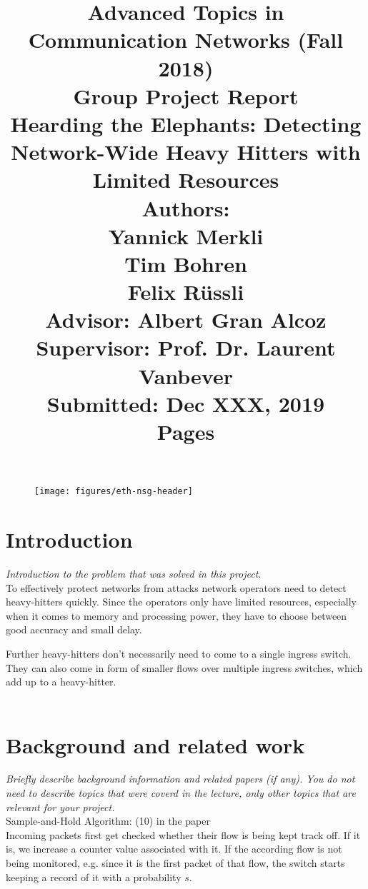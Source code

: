 \documentclass[11pt,oneside,a4paper]{article}
\title{
    \vspace*{0.0mm}
    \LARGE\bf\sf Advanced Topics in \\Communication Networks (Fall 2018)
    \vspace*{10.0mm} \\
    \Large\bf\sf Group Project Report \vspace*{30.0mm}\\
    \Huge\bf\sf Hearding the Elephants: Detecting Network-Wide Heavy Hitters with Limited Resources
    \vspace*{30.0mm} \\
    \normalsize
    \sf Authors:\\[5pt]
    \sf Yannick Merkli\\ [5pt]
    \sf Tim Bohren\\ [5pt]
    \sf Felix Rüssli \vspace*{5mm}\\
    \sf  Advisor: Albert Gran Alcoz \vspace*{5mm}\\
    \sf  Supervisor:  Prof. Dr. Laurent Vanbever \vspace*{20.0mm}\\
    \sf Submitted: Dec XXX, 2019\\ [5pt]
    \sf \pageref{lastpage} Pages
}
\date{}
\newcommand{\hint}[1]{{\color{blue} \em #1}}
\begin{document}
\begin{figure}
    \texttt{[image: figures/eth-nsg-header]}
\end{figure}

\maketitle
\thispagestyle{empty}
\raggedbottom
\clearpage


\begin{abstract}
    \lipsum[1-3]
\end{abstract}

\clearpage
\setcounter{tocdepth}{2}
\tableofcontents
\clearpage
{}

\section{Introduction}
\hint{Introduction to the problem that was solved in this project.} \\

To effectively protect networks from attacks network operators need to detect heavy-hitters quickly.
Since the operators only have limited resources, especially when it comes to memory and processing power, they have to choose
between good accuracy and small delay.

Further heavy-hitters don't necessarily need to come to a single ingress switch. They can also come in form of smaller flows
over multiple ingress switches, which add up to a heavy-hitter.\\\\ %

\lipsum[1-2]

\section{Background and related work}
\hint{Briefly describe background information and related papers (if any). You do not need to describe topics that were coverd in the lecture, only other topics that are relevant for your project.} \\
Sample-and-Hold Algorithm: (10) in the paper\\

Incoming packets first get checked whether their flow is being kept track off. If it is, we increase a counter value associated with it.
If the according flow is not being monitored, e.g. since it is the first packet of that flow, the switch starts keeping a record of it with
a probability $s$.\\\\
\end{document}
